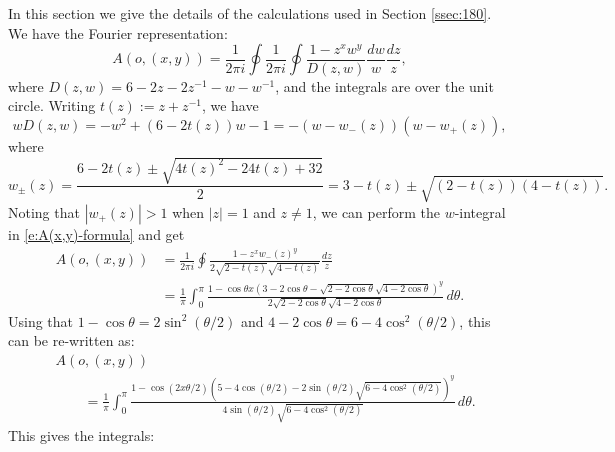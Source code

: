 \documentclass[11pt]{article}
\theoremstyle{remark}
\begin{document}
In this section we give the details of the calculations used in Section \ref{ssec:180}.
We have \cite{Sp-book,KW16} the Fourier representation:
\begin{equation}
\label{e:A(x,y)-formula}
   A(o,(x,y))
   = \frac{1}{2 \pi i} \oint \frac{1}{2 \pi i} \oint \frac{1 - z^x w^y}{D(z,w)} \frac{dw}{w} \frac{dz}{z}, 
\end{equation}
where $D(z,w) = 6 - 2 z - 2 z^{-1} - w - w^{-1}$, and the integrals are over the unit circle.
Writing $t(z) := z + z^{-1}$, we have
\[ w D(z,w)
   = -w^2 + (6 - 2 t(z)) w - 1
   = - (w - w_-(z))(w - w_+(z)), \]
where 
\[ w_{\pm}(z) 
   = \frac{6 - 2 t(z) \pm \sqrt{4 t(z)^2 - 24 t(z) + 32}}{2}
   = 3 - t(z) \pm \sqrt{(2 - t(z))(4 - t(z))}. \]
Noting that $|w_+(z)| > 1$ when $|z| = 1$ and $z \not= 1$, we can perform the $w$-integral 
in \eqref{e:A(x,y)-formula} and get
\begin{equation}
\label{e:A(x,y)-simpler}
\begin{split}
   A(o,(x,y))
   &= \frac{1}{2 \pi i} \oint \frac{1 - z^x w_-(z)^y}{2 \sqrt{2 - t(z)} \sqrt{4 - t(z)}} 
     \frac{dz}{z} \\
   &= \frac{1}{\pi} \int_0^{\pi} \frac{1 - \cos \theta x \left( 3 - 2 \cos \theta 
      - \sqrt{2 - 2 \cos \theta}\sqrt{4 - 2 \cos \theta} \right)^y}{2 \sqrt{2 - 2 \cos \theta} \sqrt{4 - 2 \cos \theta}} \, d\theta. 
\end{split}
\end{equation}
Using that $1 - \cos \theta = 2 \sin^2(\theta/2)$ and 
$4 - 2 \cos \theta = 6 - 4 \cos^2(\theta/2)$, this can be re-written as:
\begin{equation*}
\begin{split}
   &A(o,(x,y)) \\
   &\qquad = \frac{1}{\pi} \int_0^{\pi}  \frac{1 - \cos (2 x \theta/2) 
     \left( 5 - 4 \cos(\theta/2) - 2 \sin(\theta/2) \sqrt{6 - 4 \cos^2(\theta/2)} 
     \right)^y}{4 \sin(\theta/2) \sqrt{6 - 4 \cos^2(\theta/2)}} \, d\theta. 
\end{split}
\end{equation*}
This gives the integrals:
\end{document}
